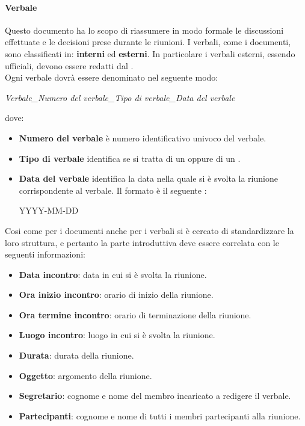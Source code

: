 \paragraph{Verbale}
Questo documento ha lo scopo di riassumere in modo formale le discussioni effettuate e le decisioni prese durante le riunioni. I verbali, come i documenti, sono classificati in:
\textbf{interni} ed \textbf{esterni}. In particolare i verbali esterni, essendo ufficiali, devono essere redatti dal \Pm. \\
Ogni verbale dovrà essere denominato nel seguente modo:
\begin{center}
  \textit{{Verbale}\_{Numero del verbale}\_{Tipo di verbale}\_{Data del verbale}}
\end{center}
dove:
\begin{itemize}
  \item \textbf{Numero del verbale} è numero identificativo univoco del verbale.
  \item \textbf{Tipo di verbale} identifica se si tratta di un \textit{\VI} oppure di un \textit{\VE}.
  \item \textbf{Data del verbale} identifica la data nella quale si è svolta la
  riunione corrispondente al verbale. Il formato è il seguente :
  \begin{center}
  YYYY-MM-DD
  \end{center}
\end{itemize}
Cosi come per i documenti anche per i verbali si è cercato di standardizzare la loro struttura, e pertanto la  parte introduttiva deve essere correlata con le seguenti informazioni:
\begin{itemize}
  \item \textbf{Data incontro}: data in cui si è svolta la riunione.
  \item \textbf{Ora inizio incontro}: orario di inizio della riunione.
  \item \textbf{Ora termine incontro}: orario di terminazione della riunione.
  \item \textbf{Luogo incontro}: luogo in cui si è svolta la riunione.
  \item \textbf{Durata}: durata della riunione.
  \item \textbf{Oggetto}: argomento della riunione.
  \item \textbf{Segretario}: cognome e nome del membro incaricato a redigere il
  verbale.
  \item \textbf{Partecipanti}: cognome e nome di tutti i membri partecipanti
  alla riunione.
\end{itemize}

